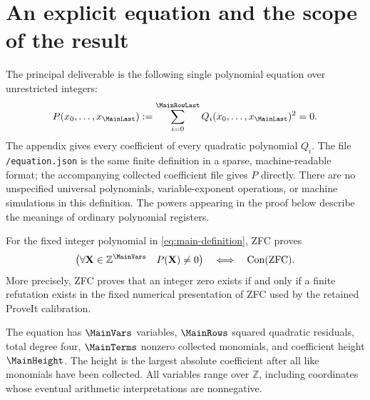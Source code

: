 \section{An explicit equation and the scope of the result}

The principal deliverable is the following single polynomial equation over
unrestricted integers:
\begin{equation}\label{eq:main-definition}
 P(x_0,\ldots,x_{\MainLast})
   :=\sum_{i=0}^{\MainRowLast}Q_i(x_0,\ldots,x_{\MainLast})^2=0.
\end{equation}
The appendix gives every coefficient of every quadratic polynomial \(Q_i\).
The file \texttt{\MainDir/\allowbreak equation.json} is the same finite definition in a
sparse, machine-readable format; the accompanying collected coefficient
file gives \(P\) directly. There are no unspecified universal polynomials,
variable-exponent operations, or machine simulations in this definition.
The powers appearing in the proof below describe the meanings of ordinary
polynomial registers.

\begin{theorem}\label{thm:main}
For the fixed integer polynomial in \eqref{eq:main-definition}, ZFC proves
\[
 \bigl(\forall \mathbf X\in\mathbb Z^{\MainVars}\quad P(\mathbf X)\ne0\bigr)
       \quad\Longleftrightarrow\quad \operatorname{Con}(\mathrm{ZFC}).
\]
More precisely, ZFC proves that an integer zero exists if and only if a
finite refutation exists in the fixed numerical presentation of ZFC used
by the retained ProveIt calibration.
\end{theorem}

The equation has \(\MainVars\) variables, \(\MainRows\) squared quadratic
residuals, total degree four, \(\MainTerms\) nonzero collected monomials,
and coefficient height \(\MainHeight\). The height is the largest absolute
coefficient after all like monomials have been collected. All variables
range over \(\mathbb Z\), including coordinates whose eventual arithmetic
interpretations are nonnegative.

